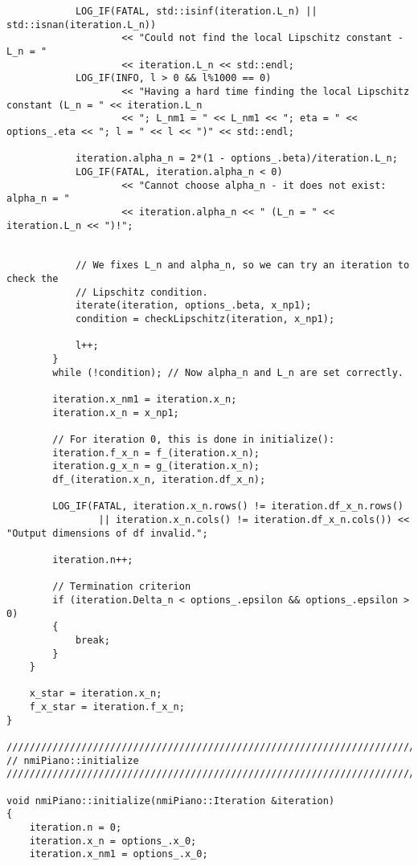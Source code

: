 \documentclass[11pt]{article}
\begin{document}
\begin{lstlisting}
            LOG_IF(FATAL, std::isinf(iteration.L_n) || std::isnan(iteration.L_n)) 
                    << "Could not find the local Lipschitz constant - L_n = " 
                    << iteration.L_n << std::endl;
            LOG_IF(INFO, l > 0 && l%1000 == 0) 
                    << "Having a hard time finding the local Lipschitz constant (L_n = " << iteration.L_n 
                    << "; L_nm1 = " << L_nm1 << "; eta = " << options_.eta << "; l = " << l << ")" << std::endl;
            
            iteration.alpha_n = 2*(1 - options_.beta)/iteration.L_n;
            LOG_IF(FATAL, iteration.alpha_n < 0)
                    << "Cannot choose alpha_n - it does not exist: alpha_n = " 
                    << iteration.alpha_n << " (L_n = " << iteration.L_n << ")!";
            
            
            // We fixes L_n and alpha_n, so we can try an iteration to check the
            // Lipschitz condition.
            iterate(iteration, options_.beta, x_np1);
            condition = checkLipschitz(iteration, x_np1);
            
            l++;
        }
        while (!condition); // Now alpha_n and L_n are set correctly.
        
        iteration.x_nm1 = iteration.x_n;
        iteration.x_n = x_np1;
        
        // For iteration 0, this is done in initialize():
        iteration.f_x_n = f_(iteration.x_n);
        iteration.g_x_n = g_(iteration.x_n);
        df_(iteration.x_n, iteration.df_x_n);
        
        LOG_IF(FATAL, iteration.x_n.rows() != iteration.df_x_n.rows() 
                || iteration.x_n.cols() != iteration.df_x_n.cols()) << "Output dimensions of df invalid.";
        
        iteration.n++;
        
        // Termination criterion
        if (iteration.Delta_n < options_.epsilon && options_.epsilon > 0)
        {
            break;
        }
    }
    
    x_star = iteration.x_n;
    f_x_star = iteration.f_x_n;
}

////////////////////////////////////////////////////////////////////////////////
// nmiPiano::initialize
////////////////////////////////////////////////////////////////////////////////

void nmiPiano::initialize(nmiPiano::Iteration &iteration)
{
    iteration.n = 0;
    iteration.x_n = options_.x_0;
    iteration.x_nm1 = options_.x_0;
    

\end{lstlisting}
\end{document}
